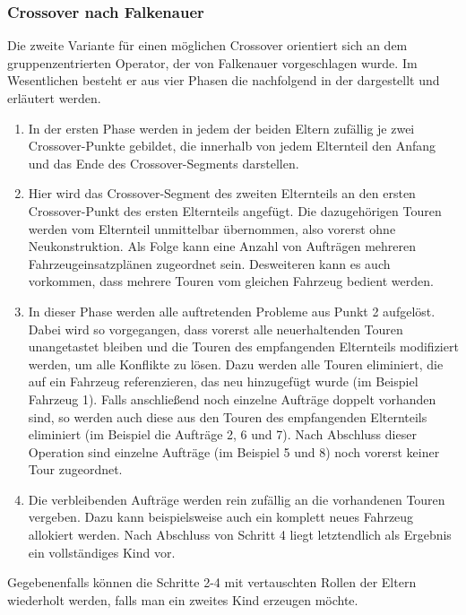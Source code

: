 \subsubsection{Crossover nach Falkenauer}
Die zweite Variante für einen möglichen Crossover orientiert sich an dem gruppenzentrierten Operator, der von Falkenauer vorgeschlagen wurde. Im Wesentlichen besteht er aus vier Phasen die nachfolgend in der  dargestellt und erläutert werden.


\begin{enumerate}
 \item In der ersten Phase werden in jedem der beiden Eltern zufällig je zwei Crossover-Punkte gebildet, die innerhalb von jedem Elternteil den Anfang und das Ende des Crossover-Segments darstellen.
 \item Hier wird das Crossover-Segment des zweiten Elternteils an den ersten Crossover-Punkt des ersten Elternteils angefügt. Die dazugehörigen Touren werden vom Elternteil unmittelbar übernommen, also vorerst ohne Neukonstruktion. Als Folge kann eine Anzahl von Aufträgen mehreren Fahrzeugeinsatzplänen zugeordnet sein. Desweiteren kann es auch vorkommen, dass mehrere Touren vom gleichen Fahrzeug bedient werden.
 \item In dieser Phase werden alle auftretenden Probleme aus Punkt 2 aufgelöst. Dabei wird so vorgegangen, dass vorerst alle neuerhaltenden Touren unangetastet bleiben und die Touren des empfangenden Elternteils modifiziert werden, um alle Konflikte zu lösen. Dazu werden alle Touren eliminiert, die auf ein Fahrzeug referenzieren, das neu hinzugefügt wurde (im Beispiel Fahrzeug 1). Falls anschließend noch einzelne Aufträge doppelt vorhanden sind, so werden auch diese aus den Touren des empfangenden Elternteils eliminiert (im Beispiel die Aufträge 2, 6 und 7). Nach Abschluss dieser Operation sind einzelne Aufträge (im Beispiel 5 und 8) noch vorerst keiner Tour zugeordnet.
 \item Die verbleibenden Aufträge werden rein zufällig an die vorhandenen Touren vergeben. Dazu kann beispielsweise auch ein komplett neues Fahrzeug allokiert werden. Nach Abschluss von Schritt 4 liegt letztendlich als Ergebnis ein vollständiges Kind vor.
\end{enumerate}

Gegebenenfalls können die Schritte 2-4 mit vertauschten Rollen der Eltern wiederholt werden, falls man ein zweites Kind erzeugen möchte.

